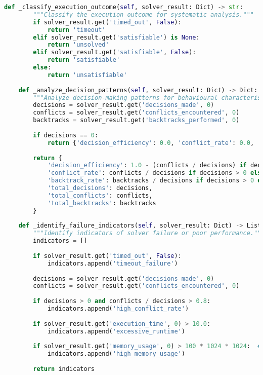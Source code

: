 \begin{lstlisting}[language=Python, caption=Systematic Failure Mode Documentation and Recovery Analysis]
    def _classify_execution_outcome(self, solver_result: Dict) -> str:
        """Classify the execution outcome for systematic analysis."""
        if solver_result.get('timed_out', False):
            return 'timeout'
        elif solver_result.get('satisfiable') is None:
            return 'unsolved'
        elif solver_result.get('satisfiable', False):
            return 'satisfiable'
        else:
            return 'unsatisfiable'
    
    def _analyze_decision_patterns(self, solver_result: Dict) -> Dict:
        """Analyze decision-making patterns for behavioural characterisation."""
        decisions = solver_result.get('decisions_made', 0)
        conflicts = solver_result.get('conflicts_encountered', 0)
        backtracks = solver_result.get('backtracks_performed', 0)
        
        if decisions == 0:
            return {'decision_efficiency': 0.0, 'conflict_rate': 0.0, 'backtrack_rate': 0.0}
        
        return {
            'decision_efficiency': 1.0 - (conflicts / decisions) if decisions > 0 else 0.0,
            'conflict_rate': conflicts / decisions if decisions > 0 else 0.0,
            'backtrack_rate': backtracks / decisions if decisions > 0 else 0.0,
            'total_decisions': decisions,
            'total_conflicts': conflicts,
            'total_backtracks': backtracks
        }
    
    def _identify_failure_indicators(self, solver_result: Dict) -> List[str]:
        """Identify indicators of solver failure or poor performance."""
        indicators = []
        
        if solver_result.get('timed_out', False):
            indicators.append('timeout_failure')
        
        decisions = solver_result.get('decisions_made', 0)
        conflicts = solver_result.get('conflicts_encountered', 0)
        
        if decisions > 0 and conflicts / decisions > 0.8:
            indicators.append('high_conflict_rate')
        
        if solver_result.get('execution_time', 0) > 10.0:
            indicators.append('excessive_runtime')
        
        if solver_result.get('memory_usage', 0) > 100 * 1024 * 1024:  # 100MB
            indicators.append('high_memory_usage')
        
        return indicators
    

\end{lstlisting}
